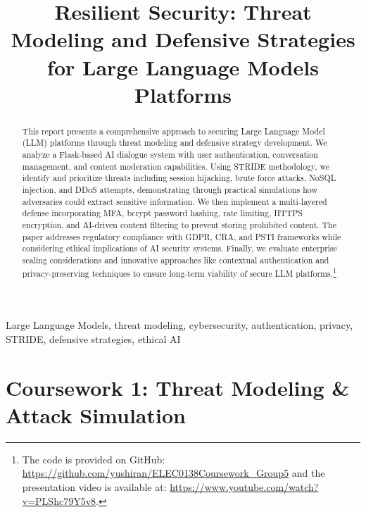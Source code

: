 \documentclass{article}
\title{Resilient Security: Threat Modeling and Defensive Strategies for Large Language Models Platforms}
\begin{document}
\maketitle
%
\begin{abstract}
    This report presents a comprehensive approach to securing Large Language Model (LLM) platforms through threat modeling and defensive strategy development. We analyze a Flask-based AI dialogue system with user authentication, conversation management, and content moderation capabilities. 
    Using STRIDE methodology, we identify and prioritize threats including session hijacking, brute force attacks, NoSQL injection, and DDoS attempts, demonstrating through practical simulations how adversaries could extract sensitive information. 
    We then implement a multi-layered defense incorporating MFA, bcrypt password hashing, rate limiting, HTTPS encryption, and AI-driven content filtering to prevent storing prohibited content. 
    The paper addresses regulatory compliance with GDPR\cite{GDPR2016}, CRA, and PSTI frameworks while considering ethical implications of AI security systems. 
    Finally, we evaluate enterprise scaling considerations and innovative approaches like contextual authentication and privacy-preserving techniques to ensure long-term viability of secure LLM platforms.\footnote{The code is provided on GitHub: \url{https://github.com/yushiran/ELEC0138Coursework_Group5} and the presentation video is available at: \url{https://www.youtube.com/watch?v=PLShc79Y5v8}.}
\end{abstract}
%
\begin{keywords}
    Large Language Models, threat modeling, cybersecurity, authentication, privacy, STRIDE, defensive strategies, ethical AI
\end{keywords}

\section{Coursework 1: Threat Modeling \& Attack Simulation}
\end{document}

